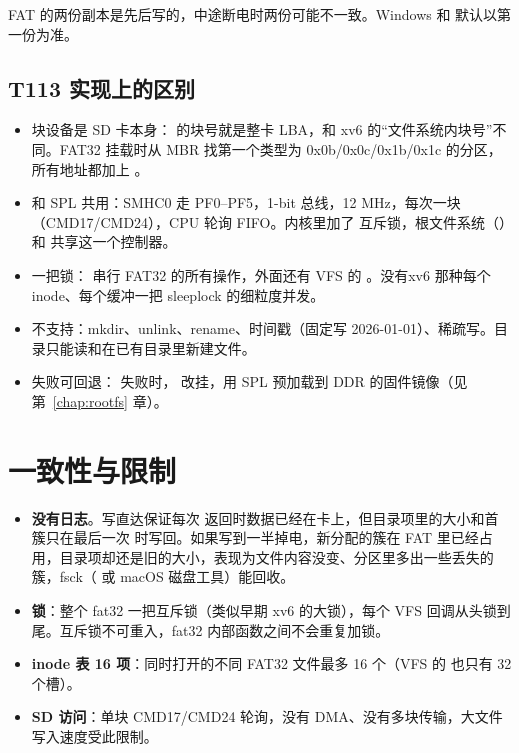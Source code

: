 FAT 的两份副本是先后写的，中途断电时两份可能不一致。Windows 和 默认以第一份为准。

\subsection{T113 实现上的区别}

\begin{itemize}
  \item 块设备是 SD 卡本身： 的块号就是整卡 LBA，和 xv6 的“文件系统内块号”不同。FAT32 挂载时从 MBR 找第一个类型为 0x0b/0x0c/0x1b/0x1c 的分区，所有地址都加上 。
  \item {} 和 SPL 共用：SMHC0 走 PF0–PF5，1-bit 总线，12 MHz，每次一块（CMD17/CMD24），CPU 轮询 FIFO。内核里加了  互斥锁，根文件系统（）和  共享这一个控制器。
  \item 一把锁： 串行 FAT32 的所有操作，外面还有 VFS 的 。没有xv6 那种每个 inode、每个缓冲一把 sleeplock 的细粒度并发。
  \item 不支持：mkdir、unlink、rename、时间戳（固定写 2026-01-01）、稀疏写。目录只能读和在已有目录里新建文件。
  \item 失败可回退： 失败时， 改挂，用 SPL 预加载到 DDR 的固件镜像（见 第~\ref{chap:rootfs} 章）。
\end{itemize}

\section{一致性与限制}

\begin{itemize}
  \item \textbf{没有日志}。写直达保证每次  返回时数据已经在卡上，但目录项里的大小和首簇只在最后一次  时写回。如果写到一半掉电，新分配的簇在 FAT 里已经占用，目录项却还是旧的大小，表现为文件内容没变、分区里多出一些丢失的簇，fsck（ 或 macOS 磁盘工具）能回收。
  \item \textbf{锁}：整个 fat32 一把互斥锁（类似早期 xv6 的大锁），每个 VFS 回调从头锁到尾。互斥锁不可重入，fat32 内部函数之间不会重复加锁。
  \item \textbf{inode 表 16 项}：同时打开的不同 FAT32 文件最多 16 个（VFS 的  也只有 32 个槽）。
  \item \textbf{SD 访问}：单块 CMD17/CMD24 轮询，没有 DMA、没有多块传输，大文件写入速度受此限制。
\end{itemize}

